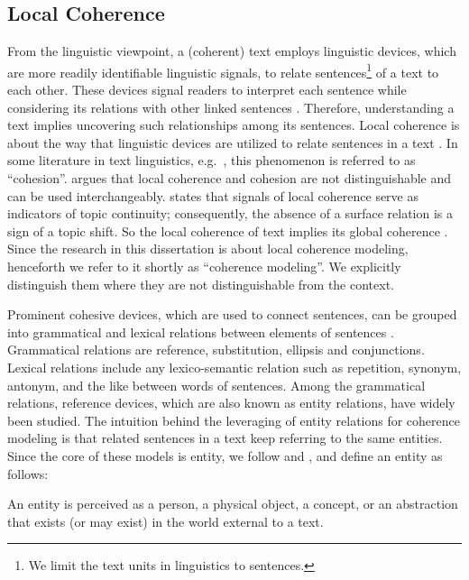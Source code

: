 \subsection{Local Coherence}

From the linguistic viewpoint, a (coherent) text employs linguistic devices, which are more readily identifiable linguistic signals, to relate sentences\footnote{We limit the text units in linguistics to sentences.} of a text to each other. 
These devices signal readers to interpret each sentence while considering its relations with other linked sentences \cite{vandijk77}. 
Therefore, understanding a text implies uncovering such relationships among its sentences. 
Local coherence is about the way that linguistic devices are utilized to relate sentences in a text \cite{stede12}.  
In some literature in text linguistics, e.g.\ , this phenomenon is referred to as ``cohesion''.    
 argues that local coherence and cohesion are not distinguishable and can be used interchangeably. 
 states that signals of local coherence serve as indicators of topic continuity; consequently, the absence of a surface relation is a sign of a topic shift. 
So the local coherence of text implies its global coherence \cite{barzilay08}.   
Since the research in this dissertation is about local coherence modeling, henceforth we refer to it shortly as ``coherence modeling''.  
We explicitly distinguish them where they are not distinguishable from the context. 

Prominent cohesive devices, which are used to connect sentences, can be grouped into grammatical and lexical relations between elements of sentences \cite{halliday76}. 
Grammatical relations are reference, substitution, ellipsis and conjunctions. 
Lexical relations include any lexico-semantic relation such as repetition, synonym, antonym, and the like between words of sentences. 
Among the grammatical relations, reference devices, which are also known as entity relations, have widely been studied.  
The intuition behind the leveraging of entity relations for coherence modeling is that related sentences in a text keep referring to the same entities. 
Since the core of these models is entity, we follow  and , and define an entity as follows: 

\begin{definition}
    An entity is perceived as a person, a physical object, a concept, or an abstraction that exists (or may exist) in the world external to a text.  
\end{definition}


